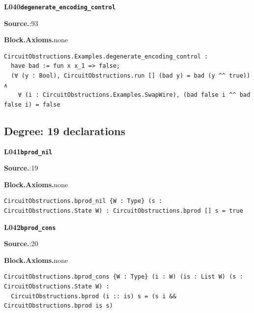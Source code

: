 \par\medskip\noindent\begin{minipage}{\textwidth}
{\small\bfseries L040\enspace\texttt{degenerate\_encoding\_control}\par}
{\footnotesize\raggedright\textbf{Source.}\enspace{}:93\par
\textbf{Block.}\quad\textbf{Axioms.}\enspace none\par}\nopagebreak
\begin{lstlisting}
CircuitObstructions.Examples.degenerate_encoding_control :
  have bad := fun x x_1 => false;
  (∀ (y : Bool), CircuitObstructions.run [] (bad y) = bad (y ^^ true)) ∧
    ∀ (i : CircuitObstructions.Examples.SwapWire), (bad false i ^^ bad false i) = false
\end{lstlisting}
\end{minipage}\par

\subsection*{Degree: 19 declarations}
\par\medskip\noindent\begin{minipage}{\textwidth}
{\small\bfseries L041\enspace\texttt{bprod\_nil}\par}
{\footnotesize\raggedright\textbf{Source.}\enspace{}:19\par
\textbf{Block.}\quad\textbf{Axioms.}\enspace none\par}\nopagebreak
\begin{lstlisting}
CircuitObstructions.bprod_nil {W : Type} (s : CircuitObstructions.State W) : CircuitObstructions.bprod [] s = true
\end{lstlisting}
\end{minipage}\par

\par\medskip\noindent\begin{minipage}{\textwidth}
{\small\bfseries L042\enspace\texttt{bprod\_cons}\par}
{\footnotesize\raggedright\textbf{Source.}\enspace{}:20\par
\textbf{Block.}\quad\textbf{Axioms.}\enspace none\par}\nopagebreak
\begin{lstlisting}
CircuitObstructions.bprod_cons {W : Type} (i : W) (is : List W) (s : CircuitObstructions.State W) :
  CircuitObstructions.bprod (i :: is) s = (s i && CircuitObstructions.bprod is s)
\end{lstlisting}
\end{minipage}\par

